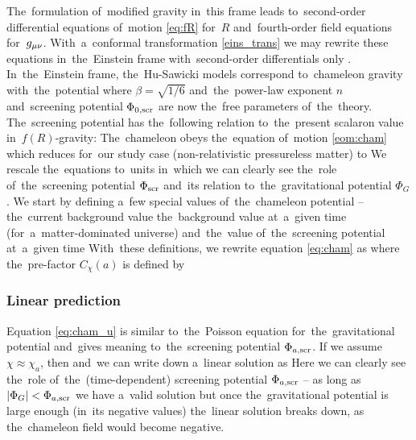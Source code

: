 The~formulation of~modified gravity in~this frame leads to~second-order differential equations of~motion \eqref{eq:fR} for~$R$ and~fourth-order field equations for~$g_{\mu\nu}$. With~a~conformal transformation \eqref{eins_trans} we may rewrite these equations in~the~Einstein frame with~second-order differentials only \parencite[see, e.g.,][]{CHIBA20031}. In~the~Einstein frame, the~Hu-Sawicki models correspond to~chameleon gravity with~the~potential
where $\beta=\sqrt{1/6}$ and~the~power-law exponent $n$ and~screening potential $\Phi_{0,\text{\scriptsize scr}}$ are now the~free parameters of~the~theory. The~screening potential has the~following relation to~the~present scalaron value in~$f(R)$-gravity:
The~chameleon obeys the~equation of~motion \eqref{eom:cham} which reduces for~our study case (non-relativistic pressureless matter) to
We rescale the~equations to~units in~which we can clearly see the~role of~the~screening potential $\Phi_{\text{\scriptsize scr}}$ and~its relation to~the~gravitational potential $\Phi_G$. We start by defining a~few special values of~the~chameleon potential -- the~current background value
the~background value at~a~given time (for~a~matter-dominated universe)
and~the~value of~the~screening potential at~a~given time
With~these definitions, we rewrite equation \eqref{eq:cham} as
where the~pre-factor $C_\chi(a)$ is defined by
\subsubsection{Linear prediction}
Equation \eqref{eq:cham_u} is similar to~the~Poisson equation for~the~gravitational potential and~gives meaning to~the~screening potential $\Phi_{a,\text{\scriptsize scr}}$. If we assume $\chi\approx\chi_a$, then
and~we can write down a~linear solution as
Here we can clearly see the~role of~the~(time-dependent) screening potential $\Phi_{a,\text{\scriptsize scr}}$ -- as long as $|\Phi_G| < \Phi_{a,\text{\scriptsize scr}}$ we have a~valid solution but once the~gravitational potential is large enough (in~its negative values) the~linear solution breaks down, as the~chameleon field would become negative.

